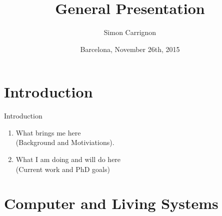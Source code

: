 \documentclass[8pt, handout=show,notes=show]{beamer}
\title{
    General Presentation
}
\date{Barcelona, November 26th, 2015}
\author{Simon Carrignon}
\begin{document}
\begin{frame}
	\maketitle

\end{frame}

\section{Introduction}
\begin{frame}{Introduction}
    \begin{enumerate}
	\item What brings me here\\ \hspace{1cm} (Background and Motiviations).
	    \vfill
	\item What I am doing and will do here\\ \hspace{1cm} (Current work and PhD goals)
    \end{enumerate}

\end{frame}

\section{Computer and Living Systems}
\end{document}
